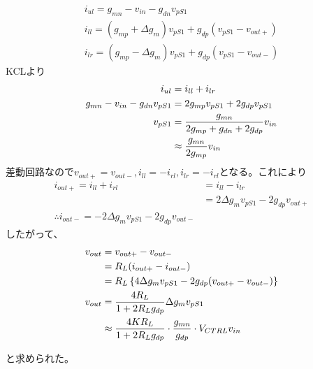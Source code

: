     \begin{align*}
        i_{ul} = g_{mn}-v_{in}-g_{dn}v_{pS1}\\
        i_{ll} = (g_{mp}+\Delta g_{m})v_{pS1}+g_{dp}(v_{pS1}-v_{out+})\\
        i_{lr} = (g_{mp}-\Delta g_{m})v_{pS1}+g_{dp}(v_{pS1}-v_{out-})
    \end{align*}
    KCLより
    \begin{align}
        i_{ul} &= i_{ll}+i_{lr}   \notag\\
        g_{mn}-v_{in}-g_{dn}v_{pS1} &= 2g_{mp}v_{pS1}+2g_{dp}v_{pS1}    \notag\\
        v_{pS1} &= \frac{g_{mn}}{ 2g_{mp}+g_{dn}+2g_{dp} }v_{in}    \notag\\
        &\approx \frac{g_{mn}}{2g_{mp}}v_{in}   \label{eq:vps1}
    \end{align}
    差動回路なので$v_{out+}=v_{out-},i_{ll}=-i_{rl},i_{lr}=-i_{rl}$となる。これにより
    \begin{align*}
        i_{out+}=i_{ll}+i_{rl} &= i_{ll}-i_{lr}   \\
        &= 2\Delta g_{m}v_{pS1}-2g_{dp}v_{out+}     \\
        \therefore i_{out-} = -2\Delta g_{m}v_{pS1}-2g_{dp}v_{out-}    
    \end{align*}
    したがって、
    \begin{align}
        v_{out} &= v_{out+}-v_{out-}    \notag\\
        &= R_{L}(i_{out+}-i_{out-})     \notag\\
        &= R_{L}\left\{ 4\Delta g_{m}v_{pS1} -2g_{dp}(v_{out+}-v_{out-}) \right\}   \notag\\
        v_{out} &= \frac{4R_{L}}{1+2R_{L}g_{dp}}\Delta g_{m}v_{pS1}     \notag\\
        &\approx \frac{4KR_{L}}{1+2R_{L}g_{dp}}\cdot\frac{g_{mn}}{g_{dp}}\cdot V_{CTRL}v_{in}   \label{eq:vout_base}
    \end{align}

    と求められた。

\subsection{}

